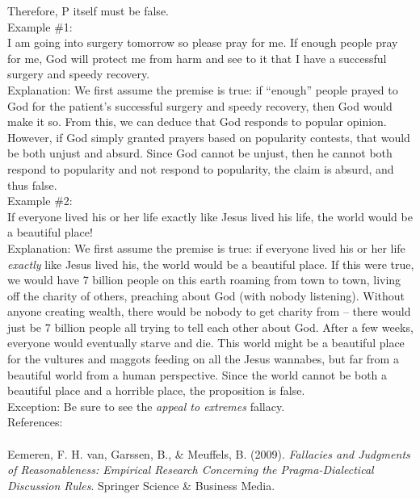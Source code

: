 \documentclass[a4paper,12pt,single,pdftex]{scrbook}
\begin{document}
{      
        Therefore, P itself must be false.
      \\

      
        Example \#1:
      \\

      
        I am going into surgery tomorrow so please pray for me.  If enough people pray for me, God will protect me from harm and see to it that I have a successful surgery and speedy recovery.
      \\

      
        Explanation: We first assume the premise is true: if “enough” people prayed to God for the patient's successful surgery and speedy recovery, then God would make it so.  From this, we can deduce that God responds to popular opinion.  However, if God simply granted prayers based on popularity contests, that would be both unjust and absurd.  Since God cannot be unjust, then he cannot both respond to popularity and not respond to popularity, the claim is absurd, and thus false.
      \\

      
        Example \#2:
      \\

      
        If everyone lived his or her life exactly like Jesus lived his life, the world would be a beautiful place!
      \\

      
        Explanation: We first assume the premise is true: if everyone lived his or her life {\it exactly} like Jesus lived his, the world would be a beautiful place.  If this were true, we would have 7 billion people on this earth roaming from town to town, living off the charity of others, preaching about God (with nobody listening). Without anyone creating wealth, there would be nobody to get charity from -- there would just be 7 billion people all trying to tell each other about God.  After a few weeks, everyone would eventually starve and die.  This world might be a beautiful place for the vultures and maggots feeding on all the Jesus wannabes, but far from a beautiful world from a human perspective.  Since the world cannot be both a beautiful place and a horrible place, the proposition is false.
      \\

      
        Exception: Be sure to see the {\it appeal to extremes}  fallacy.
      \\

    
    
      References:
    \\

    
      
        
      \\

      
        
          Eemeren, F. H. van, Garssen, B., \& Meuffels, B. (2009). {\it Fallacies and Judgments of Reasonableness: Empirical Research Concerning the Pragma-Dialectical Discussion Rules}. Springer Science \& Business Media.
        
      
    
  }
\end{document}
